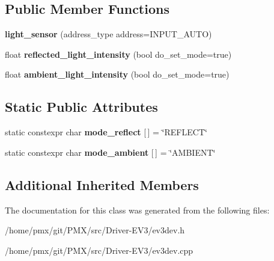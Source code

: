 \subsection*{Public Member Functions}
\begin{DoxyCompactItemize}
\item 
\mbox{\label{classev3dev_1_1light__sensor_a373fd2cebe70656338f2aa2b9819867a}} 
{\bfseries light\+\_\+sensor} (address\+\_\+type address=I\+N\+P\+U\+T\+\_\+\+A\+U\+TO)
\item 
\mbox{\label{classev3dev_1_1light__sensor_a77c8069076a74cbf1e9c442fe968b5bf}} 
float {\bfseries reflected\+\_\+light\+\_\+intensity} (bool do\+\_\+set\+\_\+mode=true)
\item 
\mbox{\label{classev3dev_1_1light__sensor_ad9f755b526ca5ceaf9ab0da1a526f00b}} 
float {\bfseries ambient\+\_\+light\+\_\+intensity} (bool do\+\_\+set\+\_\+mode=true)
\end{DoxyCompactItemize}
\subsection*{Static Public Attributes}
\begin{DoxyCompactItemize}
\item 
\mbox{\label{classev3dev_1_1light__sensor_a8ab562eaf774763dad87ce410973f7e2}} 
static constexpr char {\bfseries mode\+\_\+reflect} \mbox{[}$\,$\mbox{]} = \char`\"{}R\+E\+F\+L\+E\+CT\char`\"{}
\item 
\mbox{\label{classev3dev_1_1light__sensor_aba1f9d49804213a1d2b0d1ab5a412fbb}} 
static constexpr char {\bfseries mode\+\_\+ambient} \mbox{[}$\,$\mbox{]} = \char`\"{}A\+M\+B\+I\+E\+NT\char`\"{}
\end{DoxyCompactItemize}
\subsection*{Additional Inherited Members}


The documentation for this class was generated from the following files\+:\begin{DoxyCompactItemize}
\item 
/home/pmx/git/\+P\+M\+X/src/\+Driver-\/\+E\+V3/ev3dev.\+h\item 
/home/pmx/git/\+P\+M\+X/src/\+Driver-\/\+E\+V3/ev3dev.\+cpp\end{DoxyCompactItemize}
